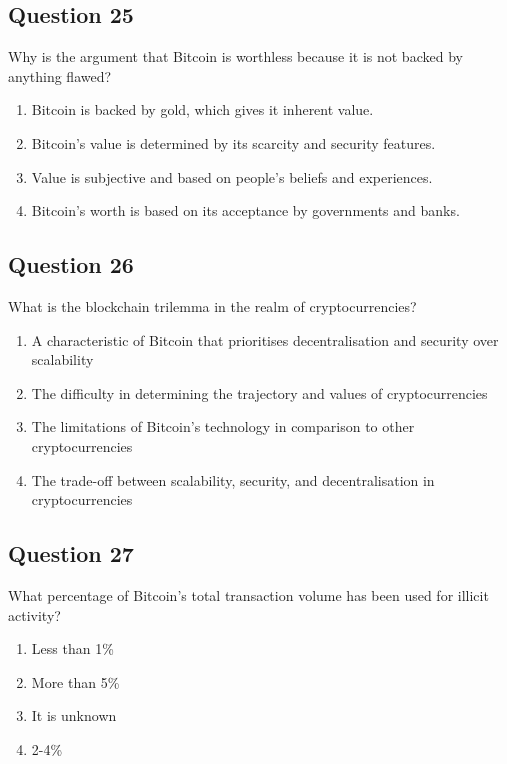 \documentclass[12pt,a4paper]{article}
\begin{document}
\bigskip


\subsection*{Question 25}
Why is the argument that Bitcoin is worthless because it is not backed by anything flawed?

\begin{enumerate}[label=\Alph*., leftmargin=*]
\item Bitcoin is backed by gold, which gives it inherent value.
\item Bitcoin's value is determined by its scarcity and security features.
\item Value is subjective and based on people's beliefs and experiences.
\item Bitcoin's worth is based on its acceptance by governments and banks.
\end{enumerate}

\bigskip


\subsection*{Question 26}
What is the blockchain trilemma in the realm of cryptocurrencies?

\begin{enumerate}[label=\Alph*., leftmargin=*]
\item A characteristic of Bitcoin that prioritises decentralisation and security over scalability
\item The difficulty in determining the trajectory and values of cryptocurrencies
\item The limitations of Bitcoin's technology in comparison to other cryptocurrencies
\item The trade-off between scalability, security, and decentralisation in cryptocurrencies
\end{enumerate}

\bigskip


\subsection*{Question 27}
What percentage of Bitcoin's total transaction volume has been used for illicit activity?

\begin{enumerate}[label=\Alph*., leftmargin=*]
\item Less than 1\%
\item More than 5\%
\item It is unknown
\item 2-4\%
\end{enumerate}
\end{document}
